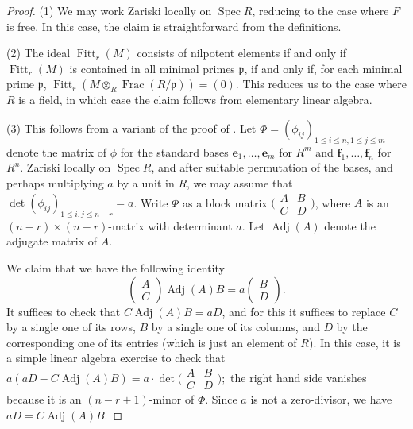 \documentclass[12pt]{article}
\theoremstyle{definition}
\numberwithin{equation}{theorem}
\newcommand{\gothp}{\mathfrak{p}}
\newcommand{\bbe}{\mathbf{e}}
\newcommand{\bbf}{\mathbf{f}}
\DeclareMathOperator{\Adj}{Adj}
\DeclareMathOperator{\Fitt}{Fitt}
\DeclareMathOperator{\Frac}{Frac}
\DeclareMathOperator{\Spec}{Spec}
\begin{document}
\begin{proof}
(1) We may work Zariski locally on $\Spec R$, reducing to the case where $F$ is free.  In this case, the claim is straightforward from the definitions.

(2) The ideal $\Fitt_r(M)$ consists of nilpotent elements if and only if $\Fitt_r(M)$ is contained in all minimal primes $\gothp$, if and only if, for each minimal prime $\gothp$, $\Fitt_r(M \otimes_R \Frac(R/\gothp)) = (0)$.  This reduces us to the case where $R$ is a field, in which case the claim follows from elementary linear algebra.

(3)
This follows from a variant of the proof of \cite[Chapter~4,~Proposition~1~and~Lemma~1]{raynaud}.
Let $\Phi = (\phi_{ij})_{1\leq i\leq n, 1\leq j \leq m}$ denote the matrix of $\phi$ for the standard bases $\bbe_1, \dots, \bbe_m$ for $R^m$ and $\bbf_1, \dots,\bbf_n$ for $R^n$.
Zariski locally on $\Spec R$, and after suitable permutation of the bases, and perhaps multiplying $a$ by a unit in $R$, we may assume that $\det(\phi_{ij})_{1 \leq i,j \leq n-r}  = a$.
Write $\Phi$ as a block matrix $\big(\begin{smallmatrix}
A & B \\ C & D
\end{smallmatrix}\big)$, where $A$ is an $(n-r)\times(n-r)$-matrix with determinant $a$.  Let $\Adj(A) $ denote the adjugate matrix of $A$.

We claim that we have the following identity
\begin{equation}
\label{E:linear algebra}
\begin{pmatrix}
A\\ C
\end{pmatrix}
\Adj (A) B = a
\begin{pmatrix}
B\\ D
\end{pmatrix}.
\end{equation}
It suffices to check that $C \Adj(A)B = a D$, and for this it suffices to replace $C$ by a single one of its rows, $B$ by a single one of its columns, and $D$ by the corresponding one of its entries (which is just an element of $R$).
In this case, it is a simple linear algebra exercise to check that
$
a(aD - C\Adj(A)B) = a \cdot \det
\big(\begin{smallmatrix}
A&B\\C& D
\end{smallmatrix}\big);
$
the right hand side vanishes because it is an $(n-r+1)$-minor of $\Phi$.
Since $a$ is not a zero-divisor, we have $aD = C \Adj(A)B$.


\end{proof}
\end{document}
